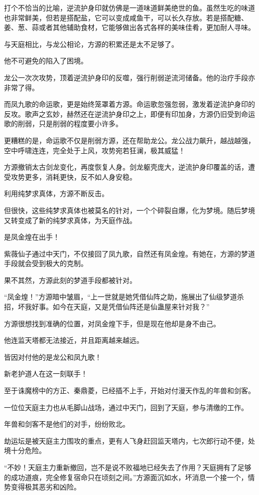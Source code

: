 \begin{this_body}
打个不恰当的比喻，逆流护身印就仿佛是一道味道鲜美绝世的鱼。虽然生吃的味道也非常鲜美，但若是搭配盐，它可以变成咸鱼干，可以长久存放。若是搭配糖、姜、葱、蒜或者其他辅助食材，它能够做出各式各样的美味佳肴，更加耐人寻味。

与天庭相比，与龙公相论，方源的积累还是太不足够了。

他不可避免的陷入了困境。

龙公一次次攻势，顶着逆流护身印的反噬，强行削弱逆流河储备。他的治疗手段亦非常了得。

而凤九歌的命运歌，更是始终笼罩着方源。命运歌忽强忽弱，激发着逆流护身印的反攻。歌声之玄妙，赫然还在逆流护身印之上，即便有印加身，方源仍旧受到命运歌的削弱，只是削弱的程度要小许多。

更糟糕的是，命运歌不仅是削弱方源，还在帮助龙公。龙公战力飙升，越战越强，空中呼啸连连，完全处于上风，攻势宛若狂澜，极其威猛！

方源撤销太古剑龙变化，再度恢复人身。剑龙躯壳庞大，逆流护身印覆盖的话，遭受攻势更多，消耗更快，反不如人身安稳。

利用纯梦求真体，方源不断反击。

但很快，这些纯梦求真体也被莫名的针对，一个个碎裂自爆，化为梦境。随后梦境又转变成了新的纯梦求真体，为天庭作战。

是凤金煌在出手！

紫薇仙子通过中天门，不仅接回了凤九歌，自然还有凤金煌。有她在，方源的梦道手段就会受到极大的克制。

果不其然，方源此刻的梦道手段都被针对。

“凤金煌！”方源暗中皱眉，“上一世就是她凭借仙阵之助，施展出了仙级梦道杀招，坏我好事。如今在天庭，又是凭借仙阵还是仙蛊屋来针对我？”

方源很想找到准确的位置，对凤金煌下手，但是现在他却是身不由己。

他连监天塔都无法接近，并且距离越来越远。

皆因对付他的是龙公和凤九歌！

新老护道人在这一刻联手！

至于诛魔榜中的方正、秦鼎菱，已经插不上手，开始对付漫天作乱的年兽和剑客。

一位位天庭主力也从毛脚山战场，通过中天门，回到了天庭，参与清缴的工作。

年兽和剑客不是他们的对手，纷纷败北。

劫运坛是被天庭主力围攻的重点，更有人飞身赶回监天塔内，七次郎行动不便，处境十分危险。

“不妙！天庭主力重新撤回，岂不是说不败福地已经失去了作用？天庭拥有了足够的成功道痕，完全修复宿命只在顷刻之间。”方源面沉如水，坏消息一个接一个，情势变得极其恶劣和凶险。


\end{this_body}
